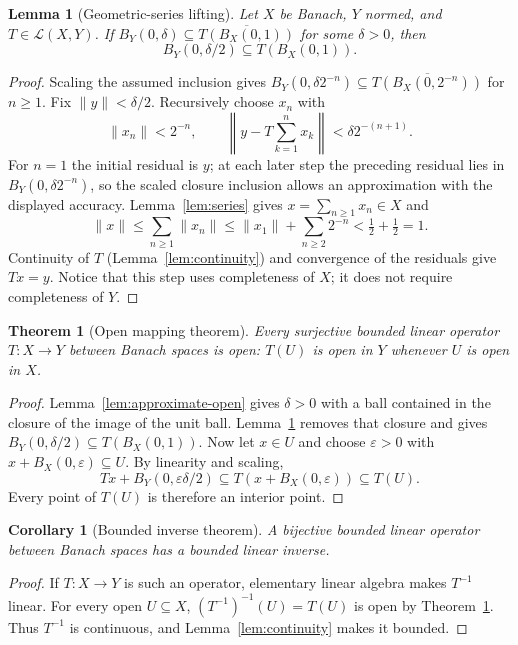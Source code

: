 \documentclass[11pt,a4paper]{article}
\theoremstyle{definition}
\theoremstyle{plain}
\newtheorem{theorem}[definition]{Theorem}
\newtheorem{lemma}[definition]{Lemma}
\newtheorem{corollary}[definition]{Corollary}
\newcommand{\norm}[1]{\lVert #1\rVert}
\begin{document}
\begin{lemma}[Geometric-series lifting]\label{lem:lifting}
Let $X$ be Banach, $Y$ normed, and $T\in\mathcal L(X,Y)$.
If $B_Y(0,\delta)\subseteq\overline{T(B_X(0,1))}$ for some $\delta>0$,
then
\[
 B_Y(0,\delta/2)\subseteq T(B_X(0,1)).
\]
\end{lemma}
\begin{proof}
Scaling the assumed inclusion gives
$B_Y(0,\delta2^{-n})\subseteq\overline{T(B_X(0,2^{-n}))}$ for $n\ge1$.
Fix $\norm{y}<\delta/2$. Recursively choose $x_n$ with
\[
 \norm{x_n}<2^{-n},\qquad
 \left\|y-T\sum_{k=1}^{n}x_k\right\|<\delta2^{-(n+1)}.
\]
For $n=1$ the initial residual is $y$; at each later step the preceding
residual lies in $B_Y(0,\delta2^{-n})$, so the scaled closure inclusion
allows an approximation with the displayed accuracy.
Lemma~\ref{lem:series} gives $x=\sum_{n\ge1}x_n\in X$ and
\[
 \norm{x}\le\sum_{n\ge1}\norm{x_n}
 \le\norm{x_1}+\sum_{n\ge2}2^{-n}<\tfrac12+\tfrac12=1.
\]
Continuity of $T$ (Lemma~\ref{lem:continuity}) and convergence of the
residuals give $Tx=y$. Notice that this step uses completeness of $X$;
it does not require completeness of $Y$.
\end{proof}

\begin{theorem}[Open mapping theorem]\label{thm:open-mapping}
Every surjective bounded linear operator $T:X\to Y$ between Banach
spaces is open: $T(U)$ is open in $Y$ whenever $U$ is open in $X$.
\end{theorem}
\begin{proof}
Lemma~\ref{lem:approximate-open} gives $\delta>0$ with a ball contained
in the closure of the image of the unit ball.
Lemma~\ref{lem:lifting} removes that closure and gives
$B_Y(0,\delta/2)\subseteq T(B_X(0,1))$.
Now let $x\in U$ and choose $\varepsilon>0$ with
$x+B_X(0,\varepsilon)\subseteq U$. By linearity and scaling,
\[
 Tx+B_Y(0,\varepsilon\delta/2)
 \subseteq T(x+B_X(0,\varepsilon))\subseteq T(U).
\]
Every point of $T(U)$ is therefore an interior point.
\end{proof}

\begin{corollary}[Bounded inverse theorem]\label{cor:bounded-inverse}
A bijective bounded linear operator between Banach spaces has a bounded
linear inverse.
\end{corollary}
\begin{proof}
If $T:X\to Y$ is such an operator, elementary linear algebra makes
$T^{-1}$ linear. For every open $U\subseteq X$,
$(T^{-1})^{-1}(U)=T(U)$ is open by Theorem~\ref{thm:open-mapping}.
Thus $T^{-1}$ is continuous, and Lemma~\ref{lem:continuity} makes it bounded.
\end{proof}
\end{document}
